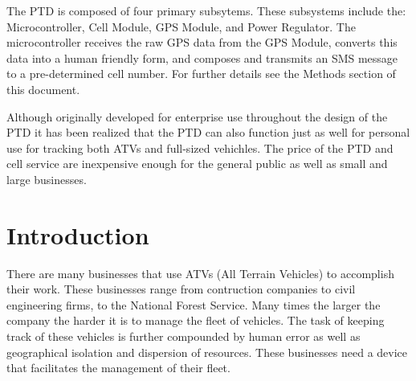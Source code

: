 \documentclass[11pt]{article}
\begin{document}
The PTD is composed of four primary subsytems. These subsystems include the: Microcontroller, Cell Module, GPS Module, and Power Regulator. The microcontroller receives the raw
GPS data from the GPS Module, converts this data into a human friendly form, and composes and transmits an SMS message to a pre-determined cell number. For further details
see the Methods section of this document. 

Although originally developed for enterprise use throughout the design of the PTD it has been realized that the PTD can also function just as well for personal use for tracking
both ATVs and full-sized vehichles. The price of the PTD and cell service are inexpensive enough for the general public as well as small and large businesses. 
 
\section{Introduction}
There are many businesses that use ATVs (All Terrain Vehicles) to accomplish their work. These businesses range from contruction companies to civil
engineering firms, to the National Forest Service. Many times the larger the company the harder it is to manage the fleet of vehicles. The task of
keeping track of these vehicles is further compounded by human error as well as geographical isolation and dispersion of resources. These businesses
need a device that facilitates the management of their fleet. 
\end{document}
